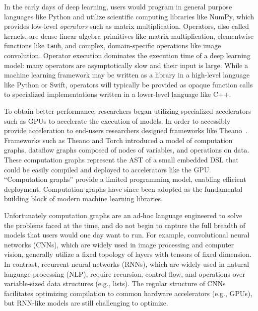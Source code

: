 In the early days of deep learning, users would program
  in general purpose languages like Python and utilize
  scientific computing libraries like NumPy,
  which provides low-level \textit{operators} such as matrix multiplication.
Operators, also called kernels,
  are dense linear algebra primitives like matrix multiplication,
  elementwise functions like \verb|tanh|, and complex,
  domain-specific operations like image convolution.
Operator execution dominates the execution time of a deep learning model: many
  operators are asymptotically slow and their input is large.
While a machine learning framework may be written as a library in a high-level language
  like Python or Swift, operators will typically be provided as opaque function calls to
  specialized implementations written in a lower-level language like C++.

To obtain better performance, researchers began utilizing specialized
  accelerators such as GPUs to accelerate the execution of models.
In order to accessibly provide acceleration to end-users
  researchers designed frameworks like Theano~\citep{theano}.
Frameworks such as Theano and Torch introduced a model of
  computation graphs, dataflow graphs composed of nodes of
    variables, and operations on data.
These computation graphs represent the AST of a small
  embedded DSL that could be easily compiled and deployed
  to accelerators like the GPU.
``Computation graphs'' provide a limited programming model,
    enabling efficient deployment.
Computation graphs have since been adopted as the fundamental building block of modern
    machine learning libraries.

Unfortunately computation graphs are an ad-hoc language engineered to solve
  the problems faced at the time, and do not begin to capture the full breadth
  of models that users would one day want to run.
For example,
  convolutional neural networks (CNNs),
  which are widely used in image processing and computer vision,
  generally utilize a fixed topology of layers
  with tensors of fixed dimension.
In contrast,
  recurrent neural networks (RNNs),
  which are widely used in natural language processing (NLP),
  require recursion, control flow, and
  operations over variable-sized data structures (e.g., lists).
The regular structure of CNNs facilitates
  optimizing compilation to
  common hardware accelerators (e.g., GPUs), but
  RNN-like models are still challenging to optimize.

